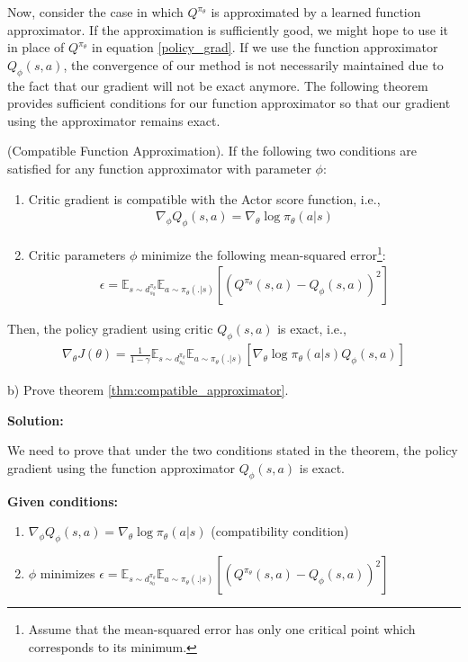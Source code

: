 Now, consider the case in which $Q^{\pi_\theta}$ is approximated by a learned function approximator. If the approximation is sufficiently good, we might hope to use it in place of $Q^{\pi_\theta}$ in equation \ref{policy_grad}. If we use the function approximator $Q_{\phi}(s, a)$, the convergence of our method is not necessarily maintained due to the fact that our gradient will not be exact anymore. The following theorem provides sufficient conditions for our function approximator so that our gradient using the approximator remains exact.

\begin{theorem}\label{thm:compatible_approximator}
    (Compatible Function Approximation). If the following two conditions are satisfied for any function approximator with parameter $\phi$:
    \begin{enumerate}
        \item Critic gradient is compatible with the Actor score function, i.e., 
        \begin{align*}
            \nabla_{\phi} Q_\phi(s, a) = \nabla_\theta \log \pi_\theta (a|s)
        \end{align*}
        \item Critic parameters $\phi$ minimize the following mean-squared error\footnote{Assume that the mean-squared error has only one critical point which corresponds to its minimum.}: 
        \begin{align*}
            \epsilon = \mathbb{E}_{s \sim d^{\pi_\theta}_{s_0}}\mathbb{E}_{a \sim \pi_\theta(.|s)} [(Q^{\pi_\theta} (s, a) - Q_\phi(s, a))^2]
        \end{align*}
    \end{enumerate}
    Then, the policy gradient using critic $Q_\phi(s, a)$ is exact, i.e., 
    \begin{align*}
            \nabla_\theta J(\theta) = \frac{1}{1-\gamma}\mathbb{E}_{s \sim d^{\pi_\theta}_{s_0}}\mathbb{E}_{a \sim \pi_\theta(.|s)} [\nabla_\theta \log \pi_\theta (a|s) Q_\phi (s, a)]
    \end{align*}
\end{theorem}

b) Prove theorem \ref{thm:compatible_approximator}.

\textbf{Solution:}

We need to prove that under the two conditions stated in the theorem, the policy gradient using the function approximator $Q_\phi(s,a)$ is exact.

\textbf{Given conditions:}
\begin{enumerate}
    \item $\nabla_{\phi} Q_\phi(s, a) = \nabla_\theta \log \pi_\theta (a|s)$ (compatibility condition)
    \item $\phi$ minimizes $\epsilon = \mathbb{E}_{s \sim d^{\pi_\theta}_{s_0}}\mathbb{E}_{a \sim \pi_\theta(.|s)} [(Q^{\pi_\theta} (s, a) - Q_\phi(s, a))^2]$
\end{enumerate}


